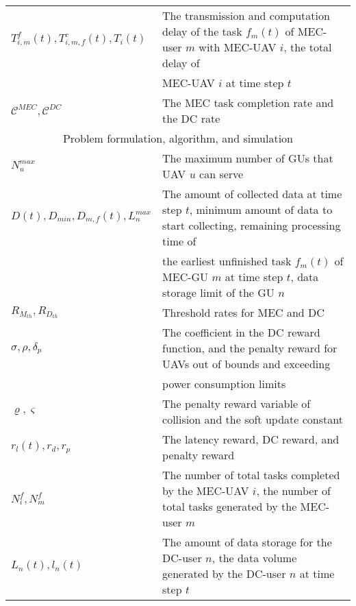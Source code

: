 \begin{table*}[]
\begin{tabularx}{\textwidth}{ll}
$T_{i,m}^f(t), T_{i,m,f}^c(t), T_i(t)$     & The transmission and computation delay of the task $f_m(t)$ of MEC-user $m$ with MEC-UAV $i$, the total delay of\\
& MEC-UAV $i$ at time step $t$                                                   \\ 
$\mathcal{C}^{MEC}, \mathcal{C}^{DC}$      & The MEC task completion rate and the DC rate\\\hline
\multicolumn{2}{c}{Problem formulation, algorithm, and simulation}                                                                                                                                         \\  \hline
$N_u^{max}$                                & The maximum number of GUs that UAV $u$ can serve                                                                                                                     \\
$D(t), D_{min}, D_{m,f}(t), L_n^{max}$                 & The amount of collected data at time step $t$, minimum amount of data to start collecting, remaining processing time of\\
& the earliest unfinished task $f_m(t)$ of MEC-GU $m$ at time step $t$, data storage limit of the GU $n$                                            \\
$R_{M_{th}}, R_{D_{th}}$                   & Threshold rates for MEC and DC                                                                                                                                     \\
$\sigma, \rho, \delta_p$  & The coefficient in the DC reward function, and the penalty reward for UAVs out of bounds and exceeding \\
                                           & power consumption limits \\
$\varrho, \varsigma$               & The penalty reward variable of collision and the soft update constant                                               \\
$r_l(t), r_d, r_p$                         & The latency reward, DC reward, and penalty reward                                                                                                                  \\
$N_i^f, N_m^f$                             & The number of total tasks completed by the MEC-UAV $i$, the number of total tasks generated by the MEC-user $m$                                                            \\
$L_n(t), l_n(t)$                           & The amount of data storage for the DC-user $n$, the data volume generated by the DC-user $n$ at time step $t$                                                                               \\
\bottomrule
\end{tabularx}%
\end{table*}


